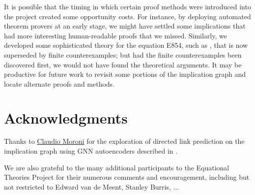It is possible that the timing in which certain proof methods were introduced into the project created some opportunity costs.  For instance, by deploying automated theorem provers at an early stage, we might have settled some implications that had more interesting human-readable proofs that we missed.  Similarly, we developed some sophisticated theory for the equation E854, such as , that is now superseded by finite counterexamples; but had the finite counterexamples been discovered first, we would not have found the theoretical arguments.  It may be productive for future work to revisit some portions of the implication graph and locate alternate proofs and methods.


\section*{Acknowledgments}

Thanks to \href{https://github.com/ClaudMor}{Claudio Moroni} for the exploration of directed link prediction
on the implication graph using GNN autoencoders described in .

We are also grateful to the many additional participants to the Equational Theories Project for their numerous comments and encouragement, including but not restricted to Edward van de Meent, Stanley Burris, ...

